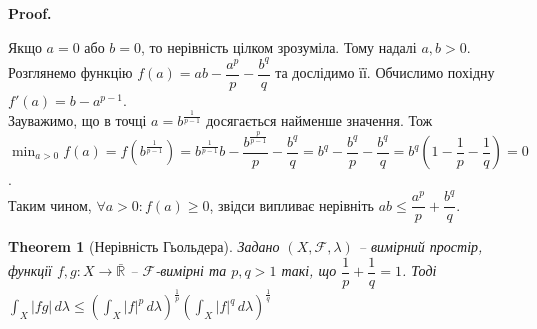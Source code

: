 \documentclass[a4paper, 10pt]{article}
\makeatletter
\theoremstyle{theoremdd}
\newtheorem{theorem}{Theorem}[subsection]
\renewenvironment{proof}[1][Proof.\\]{\par
\pushQED{\hfill \qed}%
\normalfont \topsep6\p@\@plus6\p@\relax
\trivlist
\item\relax
{\bfseries
#1\@addpunct{.}}\hspace\labelsep\ignorespaces
}{%
\popQED\endtrivlist\@endpefalse
}
\makeatother
\begin{document}
\begin{proof}
Якщо $a = 0$ або $b = 0$, то нерівність цілком зрозуміла. Тому надалі $a,b > 0$.\\
Розглянемо функцію $f(a) = ab - \dfrac{a^p}{p} - \dfrac{b^q}{q}$ та дослідимо її. Обчислимо похідну\\
$f'(a) = b - a^{p-1}$.\\
Зауважимо, що в точці $a = b^{\frac{1}{p-1}} $ досягається найменше значення. Тож\\
$\displaystyle\min_{a > 0} f(a) = f\left( b^{\frac{1}{p-1}}\right) = b^{\frac{1}{p-1}} b - \dfrac{b^{\frac{p}{p-1}}}{p} - \dfrac{b^q}{q} = b^{q} - \dfrac{b^q}{p} - \dfrac{b^q}{q} = b^q \left( 1 - \dfrac{1}{p} - \dfrac{1}{q} \right) = 0$.\\
Таким чином, $\forall a > 0: f(a) \geq 0$, звідси випливає нерівніть $ab \leq \dfrac{a^p}{p} + \dfrac{b^q}{q}$.
\end{proof}

\begin{theorem}[Нерівність Гьольдера]
Задано $(X, \mathcal{F}, \lambda)$ -- вимірний простір, функції $f,g \colon X \to \bar{\mathbb{R}}$ -- $\mathcal{F}$-вимірні та $p,q > 1$ такі, що $\dfrac{1}{p} + \dfrac{1}{q} = 1$. Тоді $\displaystyle\int_X |fg|\,d\lambda \leq \left( \int_X |f|^p\,d\lambda \right)^{\frac{1}{p}} \left( \int_X |f|^q\,d\lambda \right)^{\frac{1}{q}}$
\end{theorem}
\end{document}
